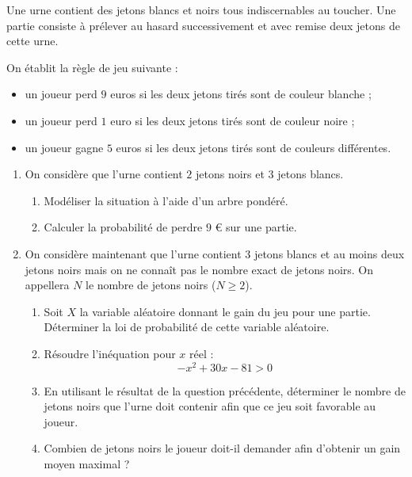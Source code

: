\documentclass[11pt,a4paper]{article}
\begin{document}
Une urne contient des jetons blancs et noirs tous indiscernables au toucher. Une partie consiste à prélever au hasard successivement et avec remise deux jetons de cette urne.

On établit la règle de jeu suivante :
\begin{itemize}[label=$\bullet$]
    \item un joueur perd $9$ euros si les deux jetons tirés sont de couleur blanche ;
    \item un joueur perd $1$ euro si les deux jetons tirés sont de couleur noire ;
    \item un joueur gagne $5$ euros si les deux jetons tirés sont de couleurs différentes.
\end{itemize}

\begin{enumerate}
    \item On considère que l'urne contient $2$ jetons noirs et $3$ jetons blancs.
    \begin{enumerate}
        \item Modéliser la situation à l'aide d'un arbre pondéré.
        \item Calculer la probabilité de perdre $9$ \euro{} sur une partie.
    \end{enumerate}
    \item On considère maintenant que l'urne contient $3$ jetons blancs et au moins deux jetons noirs mais on ne connaît pas le nombre exact de jetons noirs. On appellera $N$ le nombre de jetons noirs ($N \ge 2$).
    \begin{enumerate}
        \item Soit $X$ la variable aléatoire donnant le gain du jeu pour une partie. Déterminer la loi de probabilité de cette variable aléatoire.
        \item Résoudre l'inéquation pour $x$ réel :
        \[
        -x^2 + 30x - 81 > 0
        \]
        \item En utilisant le résultat de la question précédente, déterminer le nombre de jetons noirs que l'urne doit contenir afin que ce jeu soit favorable au joueur.
        \item Combien de jetons noirs le joueur doit-il demander afin d'obtenir un gain moyen maximal ?
    \end{enumerate}
\end{enumerate}

\vspace{0.3cm}

\end{document}
